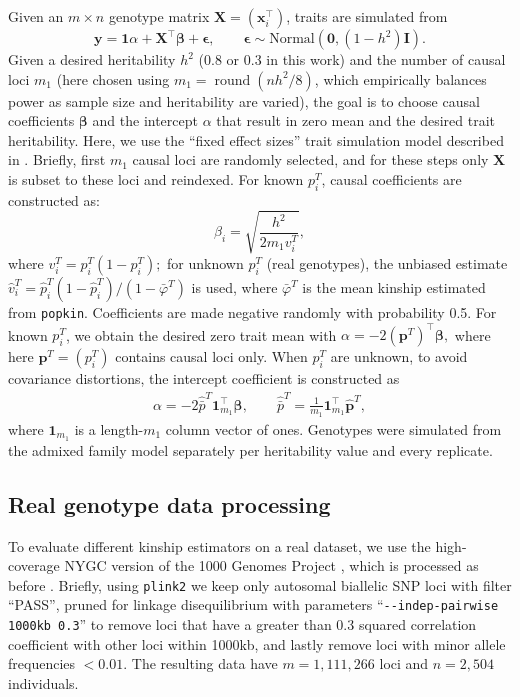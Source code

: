 \documentclass[9pt,twocolumn,twoside]{gsajnl}
\newcommand{\pit}{p_i^T}
\newcommand{\pith}{\hat{p}_i^T}
\DeclareMathOperator{\round}{round}
\begin{document}
Given an $m \times n$ genotype matrix $\mathbf{X} = (\mathbf{x}_i^\intercal)$, traits are simulated from
$$
\mathbf{y}
=
\mathbf{1} \alpha + \mathbf{X}^\intercal \boldsymbol{\beta} + \boldsymbol{\epsilon}
, \quad\quad
\boldsymbol{\epsilon} \sim \text{Normal}(\mathbf{0}, (1 - h^2) \mathbf{I})
.
$$
Given a desired heritability $h^2$ (0.8 or 0.3 in this work) and the number of causal loci $m_1$ (here chosen using $m_1 = \round( n h^2 / 8 )$, which empirically balances power as sample size and heritability are varied), the goal is to choose causal coefficients $\boldsymbol{\beta}$ and the intercept $\alpha$ that result in zero mean and the desired trait heritability.
Here, we use the ``fixed effect sizes'' trait simulation model described in \citep{yao_limitations_2022}.
Briefly, first $m_1$ causal loci are randomly selected, and for these steps only $\mathbf{X}$ is subset to these loci and reindexed.
For known $\pit$, causal coefficients are constructed as:
$$
\beta_i = \sqrt{ \frac{h^2}{ 2 m_1 v_i^T } },
$$
where
$
v_i^T
=
\pit \left( 1 - \pit \right)
;
$
for unknown $\pit$ (real genotypes), the unbiased estimate
$
\hat{v}_i^T
=
\pith \left( 1 - \pith \right) / \left( 1 - \bar{\varphi}^T \right)
$
is used, where $\bar{\varphi}^T$ is the mean kinship estimated from \texttt{popkin}.
Coefficients are made negative randomly with probability 0.5.
For known $\pit$, we obtain the desired zero trait mean with
$
\alpha 
=
- 2 \left( \mathbf{p}^T \right)^\intercal \boldsymbol{\beta}
,
$
where here $\mathbf{p}^T = (\pit)$ contains causal loci only.
When $\pit$ are unknown, to avoid covariance distortions, the intercept coefficient is constructed as
\begin{align*}
  \alpha 
  =
  - 2 \hat{\bar{p}}^T \mathbf{1}_{m_1}^\intercal \boldsymbol{\beta}
  , \quad\quad
  \hat{\bar{p}}^T
  =
  \frac{1}{m_1} \mathbf{1}_{m_1}^\intercal \mathbf{\hat{p}}^T
  ,
\end{align*}
where $\mathbf{1}_{m_1}$ is a length-$m_1$ column vector of ones.
Genotypes were simulated from the admixed family model separately per heritability value and every replicate.

\subsection{Real genotype data processing}

To evaluate different kinship estimators on a real dataset, we use the high-coverage NYGC version of the 1000 Genomes Project \citep{fairley_international_2020}, which is processed as before \citep{yao_limitations_2022}.
Briefly, using \texttt{plink2} \citep{chang_second-generation_2015} we keep only autosomal biallelic SNP loci with filter ``PASS'', pruned for linkage disequilibrium with parameters ``\texttt{-{}-indep-pairwise 1000kb 0.3}'' to remove loci that have a greater than 0.3 squared correlation coefficient with other loci within 1000kb, and lastly remove loci with minor allele frequencies $< 0.01$.
The resulting data have $m=1,111,266$ loci and $n=2,504$ individuals.
\end{document}
